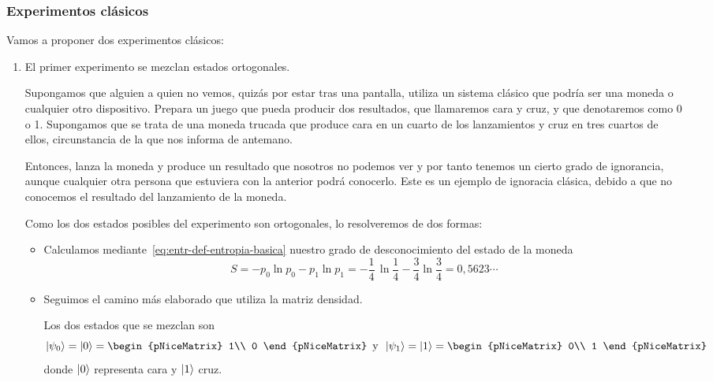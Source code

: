 \subsubsection{Experimentos clásicos}
Vamos a proponer dos experimentos clásicos:
\begin{enumerate}
\item El primer experimento se mezclan estados ortogonales.
  
    Supongamos que alguien a quien no vemos, quizás por estar tras una
    pantalla, utiliza un sistema clásico que podría ser una moneda o cualquier
    otro dispositivo. Prepara un juego que pueda producir dos resultados, que
    llamaremos cara y cruz, y que denotaremos como 0 o 1. Supongamos que se
    trata de una moneda trucada que produce cara en un cuarto de los
    lanzamientos y cruz en tres cuartos de ellos, circunstancia de la que
    nos informa de antemano.

    Entonces, lanza la moneda y produce un resultado que nosotros no podemos
    ver y por tanto tenemos un cierto grado de ignorancia, aunque cualquier
    otra persona que estuviera con la anterior podrá conocerlo.
    Este es un ejemplo de ignoracia clásica, debido a que no conocemos el
    resultado del lanzamiento de la moneda.

    Como los dos estados posibles del experimento son ortogonales, lo
    resolveremos de dos formas:
    \begin{itemize}
    \item Calculamos mediante~\eqref{eq:entr-def-entropia-basica}
      nuestro grado de desconocimiento del estado de la moneda
      \[
        S
        = -p_0\ln p_0 - p_1\ln p_1
        = -\frac{1}{4}\,\ln\frac{1}{4} - \frac{3}{4}\ln\frac{3}{4}
        = 0,5623\cdots
      \]

    \item Seguimos el camino más elaborado que utiliza la matriz densidad.

      Los dos estados que se mezclan son
      \[
        \ket{\psi_0}
        =
        \ket{0}
        =
        \begin{pNiceMatrix}
          1\\
          0
        \end{pNiceMatrix}
        \hspace{.5em}\text{y}\hspace{.5em}
        \ket{\psi_1}
        =
        \ket{1}
        =
        \begin{pNiceMatrix}
          0\\
          1
        \end{pNiceMatrix}
      \]
      donde $\ket{0}$ representa cara y $\ket{1}$ cruz.


\end{itemize}
\end{enumerate}
